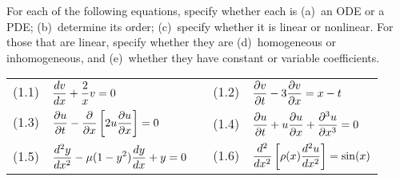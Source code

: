 For each of the following equations, specify whether each is
(a)~an ODE or a PDE; 
(b)~determine its order; 
(c)~specify whether it is linear or nonlinear.
For those that are linear, specify whether they are 
(d)~homogeneous or inhomogeneous,
and (e)~whether they have constant or variable coefficients.
\begin{center} \begin{tabular}{lcl}
(1.1)\ \  $\displaystyle {d v \over d x} + {2 \over x} v = 0$ 
& &
(1.2)\ \ $\displaystyle {\partial v \over \partial t} 
                     - 3 {\partial v \over \partial x}  = x-t $\\[2em]
(1.3)\ \  $\displaystyle {\partial u \over \partial t} 
                      - {\partial \over \partial x} 
                         \left[ 2 u {\partial u \over \partial x}\right] = 0 $
& &
(1.4)\ \  $\displaystyle {\partial u \over \partial t} 
                   + u {\partial u \over \partial x} 
                   + {\partial^3 u \over \partial x^3} = 0$ \\[2em]  %
(1.5)\ \  $\displaystyle {d^2 y \over dx^2 } 
                   - \mu (1-y^2) {d y \over d x} + y 
                   = 0$   %
& &
(1.6)\ \  $\displaystyle {d^2 \over dx^2} \left[ \rho(x) {d^2 u \over d x^2}\right] 
                    = \sin(x)$  %
\end{tabular}\end{center}


